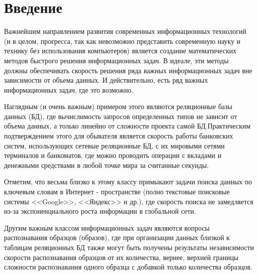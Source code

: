 \chapter*{Введение}							%
%


Важнейшим направлением развития современных информационных технологий (и в целом, прогресса, так как невозможно представить современную науку и технику  без использования компьютеров) является создание математических методов быстрого решения информационных задач. В идеале, эти методы должны обеспечивать скорость решения ряда важных информационных задач вне зависимости от объема данных. И действительно, есть ряд важных  информационных задач, где это возможно. 

Наглядным (и очень важным) примером  этого являются реляционные базы данных (БД), где вычислимость запросов определенных типов не зависит от объема данных, а только линейно от сложности проекта самой БД.Практическим подтверждением этого для обывателя является скорость работы банковских систем, использующих сетевые реляционные БД,  с их мировыми сетями терминалов и банкоматов, где можно проводить операции с вкладами и денежными средствами в любой точке мира за считанные секунды.

Отметим, что весьма близко к этому классу  примыкают задачи поиска данных по ключевым словам в Интернет - пространстве (полно текстовые поисковые системы <<Google>>, <<Яндекс>> и др.), где скорость поиска не замедляется из-за экспоненциального роста информации в глобальной сети.


Другим  важным классом информационных задач являются вопросы распознавания  образцов (образов), где при организации данных близкой к таблицам реляционных БД также могут быть получены результаты независимости скорости  распознавания  образцов от их количества, вернее, верхней границы сложности распознавания одного образца с добавкой только количества образцов. 


